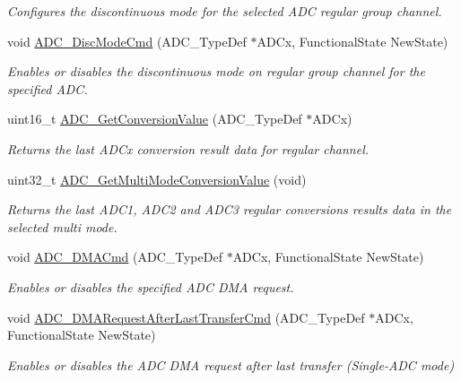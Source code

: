 \begin{DoxyCompactItemize}
\begin{DoxyCompactList}\small\item\em Configures the discontinuous mode for the selected A\-D\-C regular group channel. \end{DoxyCompactList}\item 
void \hyperlink{group___a_d_c_ga1909649d10253ce88d986ffbb94a4be6}{A\-D\-C\-\_\-\-Disc\-Mode\-Cmd} (A\-D\-C\-\_\-\-Type\-Def $\ast$A\-D\-Cx, Functional\-State New\-State)
\begin{DoxyCompactList}\small\item\em Enables or disables the discontinuous mode on regular group channel for the specified A\-D\-C. \end{DoxyCompactList}\item 
uint16\-\_\-t \hyperlink{group___a_d_c_gaaf74221c285ec5dab5e66baf7bec6bd3}{A\-D\-C\-\_\-\-Get\-Conversion\-Value} (A\-D\-C\-\_\-\-Type\-Def $\ast$A\-D\-Cx)
\begin{DoxyCompactList}\small\item\em Returns the last A\-D\-Cx conversion result data for regular channel. \end{DoxyCompactList}\item 
uint32\-\_\-t \hyperlink{group___a_d_c_ga989f4365b56be99999b8ec096aba2081}{A\-D\-C\-\_\-\-Get\-Multi\-Mode\-Conversion\-Value} (void)
\begin{DoxyCompactList}\small\item\em Returns the last A\-D\-C1, A\-D\-C2 and A\-D\-C3 regular conversions results data in the selected multi mode. \end{DoxyCompactList}\item 
void \hyperlink{group___a_d_c_gac5881d5995818001584b27b137a8dbcb}{A\-D\-C\-\_\-\-D\-M\-A\-Cmd} (A\-D\-C\-\_\-\-Type\-Def $\ast$A\-D\-Cx, Functional\-State New\-State)
\begin{DoxyCompactList}\small\item\em Enables or disables the specified A\-D\-C D\-M\-A request. \end{DoxyCompactList}\item 
void \hyperlink{group___a_d_c_ga912fd3e923ae4435621724e1bbc52729}{A\-D\-C\-\_\-\-D\-M\-A\-Request\-After\-Last\-Transfer\-Cmd} (A\-D\-C\-\_\-\-Type\-Def $\ast$A\-D\-Cx, Functional\-State New\-State)
\begin{DoxyCompactList}\small\item\em Enables or disables the A\-D\-C D\-M\-A request after last transfer (Single-\/\-A\-D\-C mode) \end{DoxyCompactList}\item 

\end{DoxyCompactItemize}

